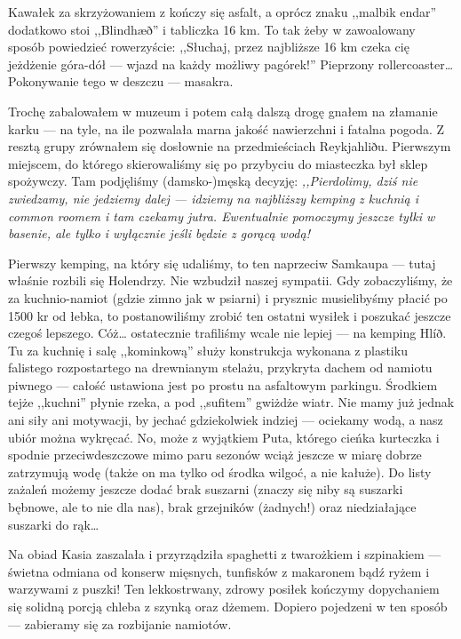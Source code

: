 Kawałek za skrzyżowaniem  z  kończy się asfalt, a oprócz znaku ,,malbik endar'' dodatkowo stoi ,,Blindhæð'' i tabliczka 16 km. To tak żeby w zawoalowany sposób powiedzieć rowerzyście: ,,Słuchaj, przez najbliższe 16 km czeka cię jeżdżenie góra-dół --- wjazd na każdy możliwy pagórek!'' Pieprzony rollercoaster… Pokonywanie tego w deszczu --- masakra.


Trochę zabalowałem w muzeum i potem całą dalszą drogę gnałem na złamanie karku --- na tyle, na ile pozwalała marna jakość nawierzchni i fatalna pogoda. Z resztą grupy zrównałem się dosłownie na przedmieściach Reykjahliðu. Pierwszym miejscem, do którego skierowaliśmy się po przybyciu do miasteczka był sklep spożywczy. Tam podjęliśmy (damsko-)męską decyzję: \emph{,,Pierdolimy, dziś nie zwiedzamy, nie jedziemy dalej --- idziemy na najbliższy kemping z kuchnią i common roomem i tam czekamy jutra. Ewentualnie pomoczymy jeszcze tyłki w basenie, ale tylko i wyłącznie jeśli będzie z gorącą wodą!}

Pierwszy kemping, na który się udaliśmy, to ten naprzeciw Samkaupa --- tutaj właśnie rozbili się Holendrzy. Nie wzbudził naszej sympatii. Gdy zobaczyliśmy, że za kuchnio-namiot (gdzie zimno jak w psiarni) i prysznic musielibyśmy płacić po 1500 kr od łebka, to postanowiliśmy zrobić ten ostatni wysiłek i poszukać jeszcze czegoś lepszego. Cóż… ostatecznie trafiliśmy wcale nie lepiej --- na kemping Hlíð. Tu za kuchnię i salę ,,kominkową'' służy konstrukcja wykonana z plastiku falistego rozpostartego na drewnianym stelażu, przykryta dachem od namiotu piwnego --- całość ustawiona jest po prostu na asfaltowym parkingu. Środkiem tejże ,,kuchni'' płynie rzeka, a pod ,,sufitem'' gwiżdże wiatr. Nie mamy już jednak ani siły ani motywacji, by jechać gdziekolwiek indziej --- ociekamy wodą, a nasz ubiór można wykręcać. No, może z wyjątkiem Puta, którego cieńka kurteczka i spodnie przeciwdeszczowe mimo paru sezonów wciąż jeszcze w miarę dobrze zatrzymują wodę (także on ma tylko od środka wilgoć, a nie kałuże). Do listy zażaleń możemy jeszcze dodać brak suszarni (znaczy się niby są suszarki bębnowe, ale to nie dla nas), brak grzejników (żadnych!) oraz niedziałające suszarki do rąk…

Na obiad Kasia zaszalała i przyrządziła spaghetti z twarożkiem i szpinakiem --- świetna odmiana od konserw mięsnych, tunfisków z makaronem bądź ryżem i warzywami z puszki! Ten lekkostrwany, zdrowy posiłek kończymy dopychaniem się solidną porcją chleba z szynką oraz dżemem. Dopiero pojedzeni w ten sposób --- zabieramy się za rozbijanie namiotów.

